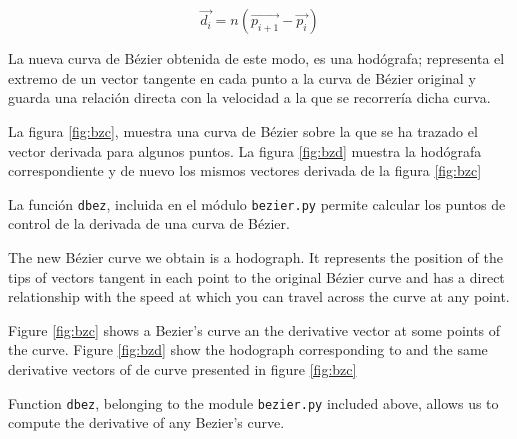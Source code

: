 \begin{equation*}
\vec{d_i} = n\left(\vec{p_{i+1}} -\vec{p_i}\right)
\end{equation*}
\begin{paracol}{2}
La nueva curva de Bézier obtenida de este modo, es una hodógrafa; representa el extremo de un vector tangente en cada punto a la curva de Bézier original  y guarda una relación directa con la velocidad a la que se recorrería dicha curva. 

La figura \ref{fig:bzc}, muestra una curva de Bézier sobre la que se ha trazado el vector derivada para algunos puntos. La figura \ref{fig:bzd} muestra la hodógrafa correspondiente y de nuevo los mismos vectores derivada de la figura \ref{fig:bzc}

La función \texttt{dbez}, incluida en el módulo \texttt{bezier.py} permite calcular los puntos de control de la derivada de una curva de Bézier.

\switchcolumn
The new Bézier curve we obtain is a hodograph. It represents the position of the tips of vectors tangent in each point to the original Bézier curve and has a direct relationship with the speed at which you can travel across the curve at any point.

Figure \ref{fig:bzc} shows a Bezier's curve an the derivative vector at some points of the curve. Figure \ref{fig:bzd} show the hodograph corresponding to and the same derivative vectors of de curve presented in figure \ref{fig:bzc}  

Function \texttt{dbez}, belonging to the module \texttt{bezier.py} included above, allows us to compute  the derivative of any Bezier's curve.
\end{paracol}

\begin{figure}[h]
\centering
{} \qquad 
{}
\label{fig:bzder}
\end{figure} 

